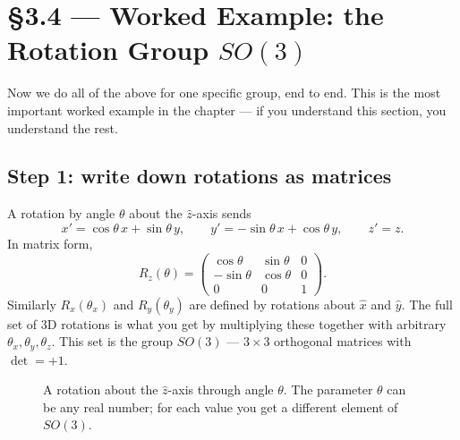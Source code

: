 \documentclass[11pt]{article}
\begin{document}
\section{\S3.4 --- Worked Example: the Rotation Group $SO(3)$}

Now we do all of the above for one specific group, end to end. This is
the most important worked example in the chapter --- if you understand
this section, you understand the rest.

\subsection*{Step 1: write down rotations as matrices}

A rotation by angle $\theta$ about the $\hat z$-axis sends
\[
  x' = \cos\theta\, x + \sin\theta\, y, \qquad
  y' = -\sin\theta\, x + \cos\theta\, y, \qquad
  z' = z.
\]
In matrix form,
\[
  R_z(\theta) = \begin{pmatrix} \cos\theta & \sin\theta & 0 \\
                                -\sin\theta & \cos\theta & 0 \\
                                0 & 0 & 1 \end{pmatrix}.
\]
Similarly $R_x(\theta_x)$ and $R_y(\theta_y)$ are defined by rotations
about $\hat x$ and $\hat y$. The full set of 3D rotations is what you
get by multiplying these together with arbitrary $\theta_x, \theta_y,
\theta_z$. This set is the group $SO(3)$ --- $3\times3$ orthogonal
matrices with $\det = +1$.

\begin{figure}[H]
\centering
{}
\caption{A rotation about the $\hat z$-axis through angle $\theta$. The
parameter $\theta$ can be any real number; for each value you get a
different element of $SO(3)$.}
\end{figure}
\end{document}

